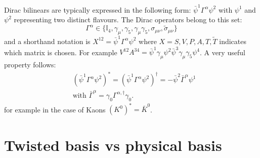 \documentclass[english, LaM, oneside, noexaminfo]{sapthesis}
\begin{document}
Dirac bilinears are typically expressed in the following form: $\bar \psi^1 \Gamma^\alpha \psi^2$ with $\psi^1$ and $\psi^2$ representing two distinct flavours.
The Dirac operators belong to this set:
\begin{equation*}
    \Gamma^{\alpha} \in \{\mathbb{I}_4,\gamma_\mu, \gamma_5, \gamma_\mu\gamma_5, \sigma_{\mu\nu}, \tilde\sigma_{\mu\nu} \}
\end{equation*}
and a shorthand notation is $X^{12} = \bar \psi^1 \Gamma^\alpha \psi^2$ where $X = S, V, P, A, T, \tilde{T}$ indicates which matrix is chosen.
For example $V^{12}A^{34} = \bar \psi^1 \gamma_\mu \psi^2 \bar \psi^3 \gamma_\mu \gamma_5 \psi^4$.
\newline
\newline
A very useful property \cite{Itzykson-Zuber} follows:
\begin{equation}\label{eq:complconj-bilinear}
    \begin{aligned}
        & \left( \bar\psi^1 \Gamma^\alpha \psi^2 \right)^* = \left( \bar\psi^1 \Gamma^\alpha \psi^2 \right)^\dag = -\bar\psi^2 \bar \Gamma^\alpha \psi^1 \\
        & \text{with } \bar \Gamma^\alpha = \gamma_0 \Gamma^{\alpha,\dag} \gamma_0.
    \end{aligned}
\end{equation}
for example in the case of Kaons $\left(K^0\right)^* = \bar K^0$.

\chapter{Twisted basis vs physical basis}\label{app:physical-basis}
\end{document}
